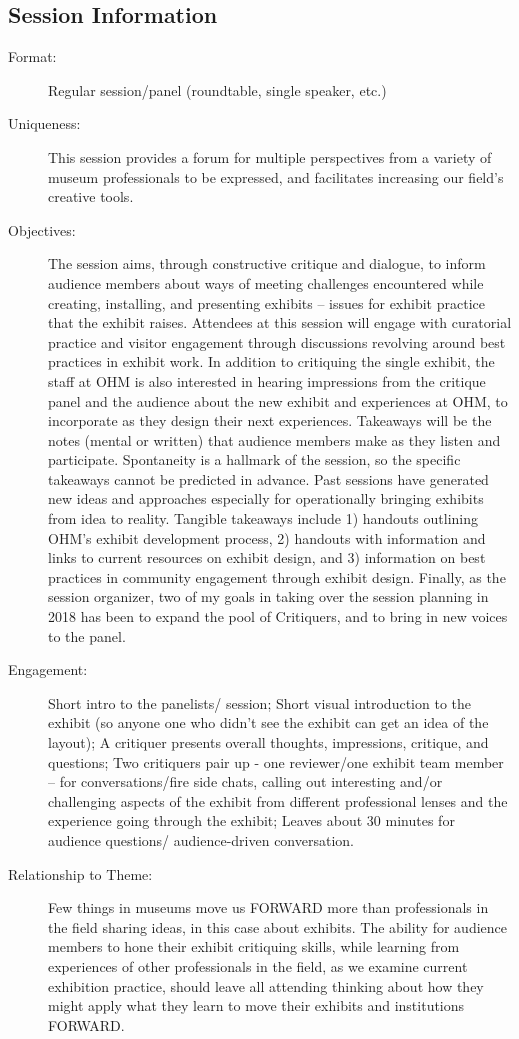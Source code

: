 \documentclass{report}
\begin{document}
              \subsection*{Session Information}
                \begin{description}
                  \item [Format:] Regular session/panel (roundtable, single speaker, etc.)
							    
							    \item [Uniqueness:]This session provides a forum for multiple perspectives from a variety of museum professionals to be expressed, and facilitates increasing our field’s creative tools.
							    \item [Objectives:]The session aims, through constructive critique and dialogue, to inform audience  members about ways of meeting challenges encountered while creating, installing, and presenting exhibits -- issues for exhibit practice that the exhibit raises. Attendees at this session will engage with curatorial practice and visitor engagement through discussions revolving around best practices in exhibit work.   In addition to critiquing the single exhibit, the staff at OHM is also interested in hearing impressions from the critique panel and the audience about the new exhibit and experiences at OHM, to incorporate as they design their next experiences. Takeaways will be the notes (mental or written) that audience members make as they listen and participate.  Spontaneity is a hallmark of the session, so the specific takeaways cannot be predicted in advance. Past sessions have generated new ideas and approaches especially for operationally bringing exhibits from idea to reality.   Tangible takeaways include 1) handouts outlining OHM’s exhibit development process, 2) handouts with information and links to current resources on exhibit design, and 3) information on best practices in community engagement through exhibit design.  Finally, as the session organizer, two of my goals in taking over the session planning in 2018 has been to expand the pool of Critiquers, and to bring in new voices to the panel.
							    \item [Engagement:]Short intro to the panelists/ session;  Short visual introduction to the exhibit (so anyone one who didn’t see the exhibit can get an idea of the layout);  A critiquer presents overall thoughts, impressions, critique, and questions;  Two critiquers pair up - one reviewer/one exhibit team member – for conversations/fire side chats, calling out interesting and/or challenging aspects of the exhibit from different professional lenses and the experience going through the exhibit;  Leaves about 30 minutes for audience questions/ audience-driven conversation.
							    \item [Relationship to Theme:]Few things in museums move us FORWARD more than professionals in the field sharing ideas, in this case about exhibits. The ability for audience members to hone their exhibit critiquing skills, while learning from experiences of other professionals in the field, as we examine current exhibition practice, should leave all attending thinking about how they might apply what they learn to move their exhibits and institutions FORWARD.
							    

\end{description}
\end{document}
